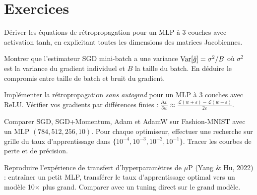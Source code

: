\section{Exercices}

\begin{exercice}
D\'eriver les \'equations de r\'etropropagation pour un MLP \`a 3 couches avec activation tanh, en explicitant toutes les dimensions des matrices Jacobiennes.
\end{exercice}

\begin{exercice}
Montrer que l'estimateur SGD mini-batch a une variance $\mathrm{Var}[\hat{g}] = \sigma^2/B$ o\`u $\sigma^2$ est la variance du gradient individuel et $B$ la taille du batch. En d\'eduire le compromis entre taille de batch et bruit du gradient.
\end{exercice}

\begin{exercice}
Impl\'ementer la r\'etropropagation \emph{sans autograd} pour un MLP \`a 3 couches avec ReLU. V\'erifier vos gradients par diff\'erences finies : $\frac{\partial \mathcal{L}}{\partial w} \approx \frac{\mathcal{L}(w+\varepsilon) - \mathcal{L}(w-\varepsilon)}{2\varepsilon}$.
\end{exercice}

\begin{exercice}
Comparer SGD, SGD+Momentum, Adam et AdamW sur Fashion-MNIST avec un MLP $(784, 512, 256, 10)$. Pour chaque optimiseur, effectuer une recherche sur grille du taux d'apprentissage dans $\{10^{-4}, 10^{-3}, 10^{-2}, 10^{-1}\}$. Tracer les courbes de perte et de pr\'ecision.
\end{exercice}

\begin{exercice}
Reproduire l'exp\'erience de transfert d'hyperparamètres de $\mu$P (Yang \& Hu, 2022) : entra\^iner un petit MLP, transf\'erer le taux d'apprentissage optimal vers un mod\`ele 10$\times$ plus grand. Comparer avec un tuning direct sur le grand mod\`ele.
\end{exercice}
